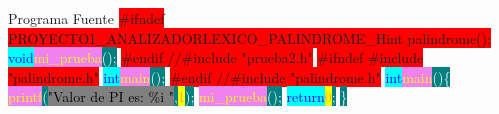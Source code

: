 \begin{frame}[allowframebreaks]{Programa Fuente}
		\newline 
{}\selectfont\textcolor{Sepia}{\colorbox{Red}{\#ifndef PROYECTO1\_ANALIZADORLEXICO\_PALINDROME\_Hint palindrome();}}\newline 
{}\selectfont\textcolor{Blue}{\colorbox{Cyan}{void}}\selectfont\textcolor{Yellow}{\colorbox{Violet}{mi\_prueba}}\selectfont\textcolor{white}{\colorbox{teal}{(}}\selectfont\textcolor{white}{\colorbox{teal}{)}}\selectfont\textcolor{white}{\colorbox{teal}{;}}\newline 
{}\selectfont\textcolor{Sepia}{\colorbox{Red}{\#endif //\#include "prueba2.h"}}\newline 
{}\selectfont\textcolor{Sepia}{\colorbox{Red}{\#ifndef \#include "palindrome.h"}}\newline 
{}\selectfont\textcolor{Blue}{\colorbox{Cyan}{int}}\selectfont\textcolor{Yellow}{\colorbox{Violet}{main}}\selectfont\textcolor{white}{\colorbox{teal}{(}}\selectfont\textcolor{white}{\colorbox{teal}{)}}\selectfont\textcolor{white}{\colorbox{teal}{;}}\newline 
{}\selectfont\textcolor{Sepia}{\colorbox{Red}{\#endif //\#include "palindrome.h"}}\newline 
{}\selectfont\textcolor{Blue}{\colorbox{Cyan}{int}}\selectfont\textcolor{Yellow}{\colorbox{Violet}{main}}\selectfont\textcolor{white}{\colorbox{teal}{(}}\selectfont\textcolor{white}{\colorbox{teal}{)}}\selectfont\textcolor{white}{\colorbox{teal}{\{}}\newline 
{}\selectfont\textcolor{Yellow}{\colorbox{Violet}{printf}}\selectfont\textcolor{white}{\colorbox{teal}{(}}\selectfont\textcolor{black}{\colorbox{gray}{"Valor de PI es: \%i \textbackslashn"}}\selectfont\textcolor{white}{\colorbox{teal}{,}}\selectfont\textcolor{orange}{\colorbox{Yellow}{1}}\selectfont\textcolor{white}{\colorbox{teal}{)}}\selectfont\textcolor{white}{\colorbox{teal}{;}}\newline 
{}\selectfont\textcolor{Yellow}{\colorbox{Violet}{mi\_prueba}}\selectfont\textcolor{white}{\colorbox{teal}{(}}\selectfont\textcolor{white}{\colorbox{teal}{)}}\selectfont\textcolor{white}{\colorbox{teal}{;}}\newline 
{}\selectfont\textcolor{Blue}{\colorbox{Cyan}{return}}\selectfont\textcolor{orange}{\colorbox{Yellow}{0}}\selectfont\textcolor{white}{\colorbox{teal}{;}}\newline 
{}\selectfont\textcolor{white}{\colorbox{teal}{\}}}
	\end{frame}
